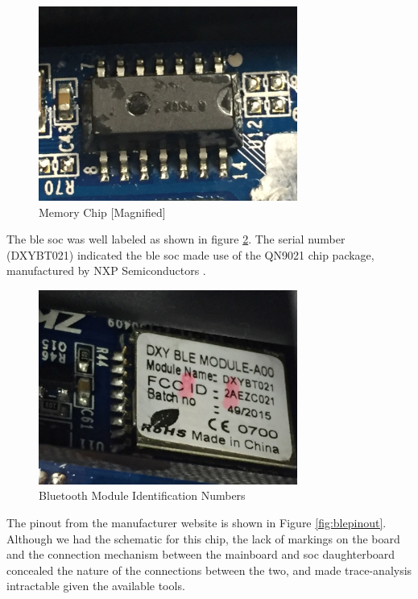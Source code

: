 \documentclass[conference]{IEEEtran}
\begin{document}
\begin{figure}[ht]
  \includegraphics[width=8.5cm]{images/MemoryChip.JPG}
  \caption{Memory Chip [Magnified]}
  \label{fig:memory}
\end{figure}

The \gls{ble} \gls{soc} was well labeled as shown in figure \ref{fig:blechip}. The serial number (DXYBT021) indicated the \gls{ble} \gls{soc} made use of the QN9021 chip package, manufactured by NXP Semiconductors \cite{NXPSemiconductors2018}. 

\begin{figure}[ht]
  \includegraphics[width=8.5cm]{images/BLEChipText2.jpg}
  \caption{Bluetooth Module Identification Numbers}
  \label{fig:blechip}
\end{figure}

The pinout from the manufacturer website is shown in Figure \ref{fig:blepinout}. Although we had the schematic for this chip, the lack of markings on the board and the connection mechanism between the mainboard and \gls{soc} daughterboard concealed the nature of the connections between the two, and made trace-analysis intractable given the available tools.
\end{document}
